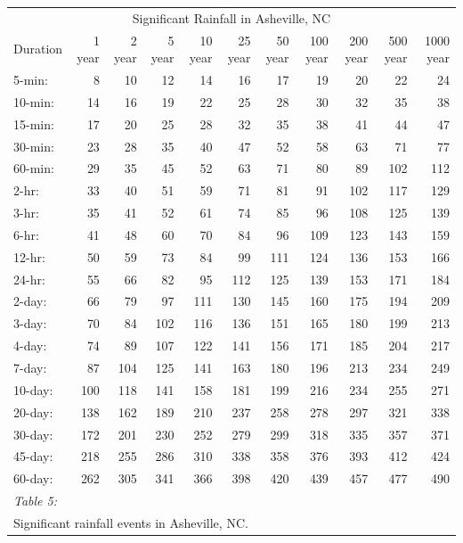 \documentclass[
]{article}
\begin{document}
\begin{table}
\centering
\begin{tabular}[t]{l|r|r|r|r|r|r|r|r|r|r}
\hline
\multicolumn{11}{c}{Significant Rainfall in Asheville, NC} \\
\cline{1-11}
Duration & 1 year & 2 year & 5 year & 10 year & 25 year & 50 year & 100 year & 200 year & 500 year & 1000 year\\
\hline
5-min: & 8 & 10 & 12 & 14 & 16 & 17 & 19 & 20 & 22 & 24\\
\hline
10-min: & 14 & 16 & 19 & 22 & 25 & 28 & 30 & 32 & 35 & 38\\
\hline
15-min: & 17 & 20 & 25 & 28 & 32 & 35 & 38 & 41 & 44 & 47\\
\hline
30-min: & 23 & 28 & 35 & 40 & 47 & 52 & 58 & 63 & 71 & 77\\
\hline
60-min: & 29 & 35 & 45 & 52 & 63 & 71 & 80 & 89 & 102 & 112\\
\hline
2-hr: & 33 & 40 & 51 & 59 & 71 & 81 & 91 & 102 & 117 & 129\\
\hline
3-hr: & 35 & 41 & 52 & 61 & 74 & 85 & 96 & 108 & 125 & 139\\
\hline
6-hr: & 41 & 48 & 60 & 70 & 84 & 96 & 109 & 123 & 143 & 159\\
\hline
12-hr: & 50 & 59 & 73 & 84 & 99 & 111 & 124 & 136 & 153 & 166\\
\hline
24-hr: & 55 & 66 & 82 & 95 & 112 & 125 & 139 & 153 & 171 & 184\\
\hline
2-day: & 66 & 79 & 97 & 111 & 130 & 145 & 160 & 175 & 194 & 209\\
\hline
3-day: & 70 & 84 & 102 & 116 & 136 & 151 & 165 & 180 & 199 & 213\\
\hline
4-day: & 74 & 89 & 107 & 122 & 141 & 156 & 171 & 185 & 204 & 217\\
\hline
7-day: & 87 & 104 & 125 & 141 & 163 & 180 & 196 & 213 & 234 & 249\\
\hline
10-day: & 100 & 118 & 141 & 158 & 181 & 199 & 216 & 234 & 255 & 271\\
\hline
20-day: & 138 & 162 & 189 & 210 & 237 & 258 & 278 & 297 & 321 & 338\\
\hline
30-day: & 172 & 201 & 230 & 252 & 279 & 299 & 318 & 335 & 357 & 371\\
\hline
45-day: & 218 & 255 & 286 & 310 & 338 & 358 & 376 & 393 & 412 & 424\\
\hline
60-day: & 262 & 305 & 341 & 366 & 398 & 420 & 439 & 457 & 477 & 490\\
\hline
\multicolumn{11}{l}{\rule{0pt}{1em}\textit{Table 5: }}\\
\multicolumn{11}{l}{\rule{0pt}{1em}Significant rainfall events in Asheville, NC.}\\
\end{tabular}
\end{table}
\end{document}

